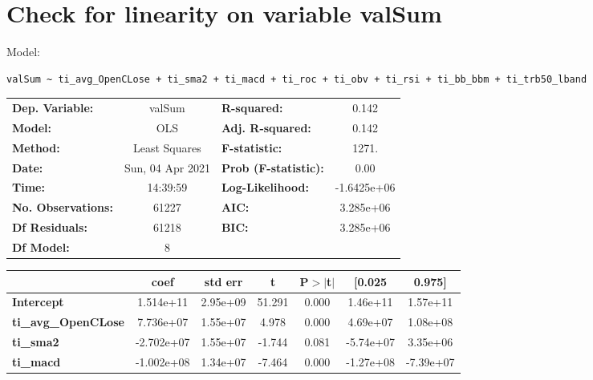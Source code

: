 \section{Check for linearity on variable valSum}

Model: \begin{verbatim}valSum ~ ti_avg_OpenCLose + ti_sma2 + ti_macd + ti_roc + ti_obv + ti_rsi + ti_bb_bbm + ti_trb50_lband\end{verbatim}

\begin{center}
\begin{tabular}{lclc}
\toprule
\textbf{Dep. Variable:}     &      valSum      & \textbf{  R-squared:         } &      0.142   \\
\textbf{Model:}             &       OLS        & \textbf{  Adj. R-squared:    } &      0.142   \\
\textbf{Method:}            &  Least Squares   & \textbf{  F-statistic:       } &      1271.   \\
\textbf{Date:}              & Sun, 04 Apr 2021 & \textbf{  Prob (F-statistic):} &      0.00    \\
\textbf{Time:}              &     14:39:59     & \textbf{  Log-Likelihood:    } & -1.6425e+06  \\
\textbf{No. Observations:}  &       61227      & \textbf{  AIC:               } &  3.285e+06   \\
\textbf{Df Residuals:}      &       61218      & \textbf{  BIC:               } &  3.285e+06   \\
\textbf{Df Model:}          &           8      & \textbf{                     } &              \\
\bottomrule
\end{tabular}
\begin{tabular}{lcccccc}
                            & \textbf{coef} & \textbf{std err} & \textbf{t} & \textbf{P$> |$t$|$} & \textbf{[0.025} & \textbf{0.975]}  \\
\midrule
\textbf{Intercept}          &    1.514e+11  &     2.95e+09     &    51.291  &         0.000        &     1.46e+11    &     1.57e+11     \\
\textbf{ti\_avg\_OpenCLose} &    7.736e+07  &     1.55e+07     &     4.978  &         0.000        &     4.69e+07    &     1.08e+08     \\
\textbf{ti\_sma2}           &   -2.702e+07  &     1.55e+07     &    -1.744  &         0.081        &    -5.74e+07    &     3.35e+06     \\
\textbf{ti\_macd}           &   -1.002e+08  &     1.34e+07     &    -7.464  &         0.000        &    -1.27e+08    &    -7.39e+07     \\

\end{tabular}
\end{center}

